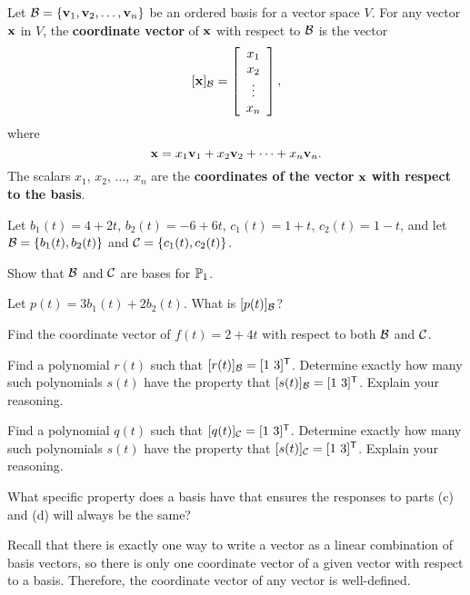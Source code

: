 \begin{definition} Let $\mathcal{B} = \{\mathbf{v}_1, \mathbf{v}_2, \ldots, \mathbf{v}_n\}$ be an ordered basis for a vector space $V$. For any vector $\mathbf{x}$ in $V$, the \textbf{coordinate vector} of $\mathbf{x}$ with respect to $\mathcal{B}$ is the vector
\[[\mathbf{x}]_{\mathcal{B}} = \left[ \begin{array}{c} x_1 \\ x_2 \\ \vdots \\ x_n \end{array} \right],\]
where
\[\mathbf{x} = x_1 \mathbf{v}_1 + x_2 \mathbf{v}_2 + \cdots + x_n \mathbf{v}_n.\]
The scalars $x_1$, $x_2$, $\ldots$, $x_n$ are the \textbf{coordinates of the vector} $\mathbf{x}$ \textbf{with respect to the basis}.  
\end{definition}

\begin{pa} \label{pa:5_d} Let $b_1(t) = 4+2t$, $b_2(t) = -6+6t$, $c_1(t) = 1+t$, $c_2(t) = 1-t$, and let $\mathcal{B} = \{b_1(t), b_2(t)\}$ and $\mathcal{C} = \{c_1(t), c_2(t)\}$.
\be
	\item Show that $\mathcal{B}$ and $\mathcal{C}$ are bases for $\mathbb{P}_1$. 

	\item Let $p(t) = 3 b_1(t) + 2 b_2(t)$. What is $[p(t)]_{\mathcal{B}}$?

	\item Find the coordinate vector of $f(t) = 2+4t$ with respect to both $\mathcal{B}$ and $\mathcal{C}$. 

	\item Find a polynomial $r(t)$ such that $[r(t)]_{\CB} = [1 \ 3]^{\tr}$. Determine exactly how many such polynomials $s(t)$ have the property that $[s(t)]_{\CB} = [1 \ 3]^{\tr}$. Explain your reasoning. 
	
	\item Find a polynomial $q(t)$ such that $[q(t)]_{\CC} = [1 \ 3]^{\tr}$. Determine exactly how many such polynomials $s(t)$ have the property that $[s(t)]_{\CC} = [1 \ 3]^{\tr}$. Explain your reasoning. 

\item What specific property does a basis have that ensures the responses to parts (c) and (d) will always be the same?  

\ee

\end{pa}

Recall that there is exactly one way to write a vector as a linear combination of basis vectors, so there is only one  coordinate vector of a given vector with respect to a basis. Therefore, the coordinate vector of any vector is well-defined.

